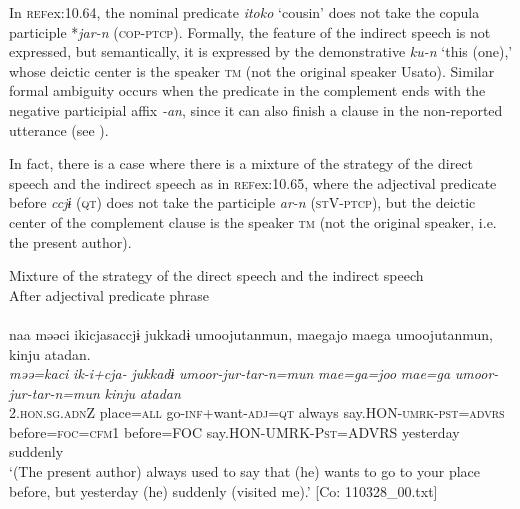In \textsc{ref}{ex:10.64}, the nominal predicate \textit{itoko} ‘cousin’ does not take the copula participle *\textit{jar-n} (\textsc{cop}-\textsc{ptcp}). Formally, the feature of the indirect speech is not expressed, but semantically, it is expressed by the demonstrative \textit{ku-n} ‘this (one),’ whose deictic center is the speaker \textsc{tm} (not the original speaker Usato). Similar formal ambiguity occurs when the predicate in the complement ends with the negative participial affix \textit{{}-an}, since it can also finish a clause in the non-reported utterance (see ).

  In fact, there is a case where there is a mixture of the strategy of the direct speech and the indirect speech as in \textsc{ref}{ex:10.65}, where the adjectival predicate before \textit{ccjɨ} (\textsc{qt}) does not take the participle \textit{ar-n} (\textsc{st}V-\textsc{ptcp}), but the deictic center of the complement clause is the speaker \textsc{tm} (not the original speaker, i.e. the present author).

\ea\label{ex:10.65}   Mixture of the strategy of the direct speech and the indirect speech\\
  After adjectival predicate phrase\\\\
      \glll    naa  məəci  ikicjasaccjɨ  jukkadɨ  umoojutanmun,  {\textbar}mae{\textbar}gajo  {\textbar}mae{\textbar}ga  umoojutanmun,  kinju  atadan.\\                                                                                                                                                     
    \textit{}  \textit{məə=kaci}  \textit{ik-i+cja-}  \textit{jukkadɨ}  \textit{umoor-jur-tar-n=mun}  \textit{mae=ga=joo}  \textit{mae=ga} \textit{umoor-jur-tar-n=mun}  \textit{kinju}  \textit{atadan}\\                                                                                                                                                     
    2.\textsc{hon}.\textsc{sg}.\textsc{adn}Z  place=\textsc{all}  go-\textsc{inf}+want-\textsc{adj}=\textsc{qt}  always   say.HON-\textsc{umrk}-\textsc{pst}=\textsc{advrs}  before=\textsc{foc}=\textsc{cfm}1  before=FOC   say.HON-UMRK-P\textsc{st}=ADVRS  yesterday  suddenly\\
    \glt ‘(The present author) always used to say that (he) wants to go to your place before, but yesterday (he) suddenly (visited me).’ [Co: 110328\_00.txt]
\z

